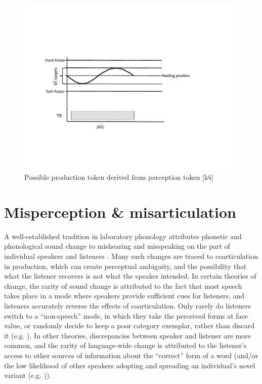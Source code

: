 \begin{figure}[H]
\centering{}\includegraphics[width=\textwidth]{figures/palatalizationc.pdf}\caption{\label{fig:Palatalizationc}Possible production token derived from
perception token {[}{kʲi}{]}}
\end{figure}


\section{\label{subsec:Misperception-=000026-Misarticulation}Misperception \& misarticulation}

A well-established tradition in laboratory phonology attributes phonetic
and phonological sound change to mishearing and misspeaking on the
part of individual speakers and listeners \citep{Ohala1980,Ohala1981,ohala1983origin,Ohala1990}.
Many such changes are traced to coarticulation in production, which
can create perceptual ambiguity, and the possibility that what the
listener recovers is not what the speaker intended. In certain theories
of change, the rarity of sound change is attributed to the fact that
most speech takes place in a mode where speakers provide sufficient
cues for listeners, and listeners accurately reverse the effects of
coarticulation. Only rarely do listeners switch to a ``non-speech''
mode, in which they take the perceived forms at face value, or randomly
decide to keep a poor category exemplar, rather than discard it (e.g.
\citealp{lindblom1990explaining,Garrett2013}). In other theories,
discrepancies between speaker and listener are more common, and the
rarity of language-wide change is attributed to the listener's access
to other sources of information about the ``correct'' form of a word
(and/or the low likelihood of other speakers adopting and spreading
an individual's novel variant (e.g. \citealt{Ohala1980})). 

